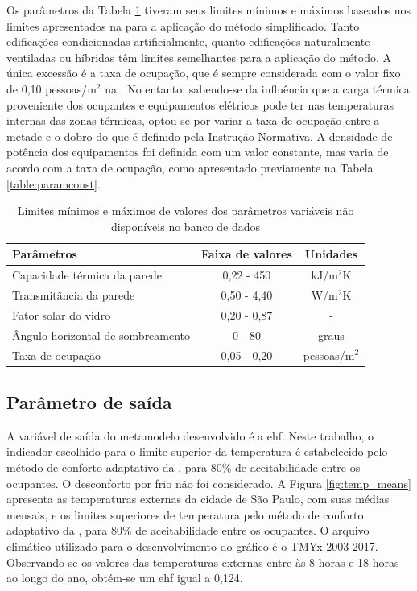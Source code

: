 \documentclass[brazil,hardcopy,openany]{ufscthesis} %
\begin{document}
Os parâmetros da Tabela \ref{table:paraminic} tiveram seus limites mínimos e máximos baseados nos limites apresentados na  para a aplicação do método simplificado. Tanto edificações condicionadas artificialmente, quanto edificações naturalmente ventiladas ou híbridas têm limites semelhantes para a aplicação do método.
A única excessão é a taxa de ocupação, que é sempre considerada com o valor fixo de 0,10 pessoas/m$^2$ na . No entanto, sabendo-se da influência que a carga térmica proveniente dos ocupantes e equipamentos elétricos pode ter nas temperaturas internas das zonas térmicas, optou-se por variar a taxa de ocupação entre a metade e o dobro do que é definido pela Instrução Normativa. A densidade de potência dos equipamentos foi definida com um valor constante, mas varia de acordo com a taxa de ocupação, como apresentado previamente na Tabela \ref{table:paramconst}.

\begin{table}[h]
	\centering
	\caption{Limites mínimos e máximos de valores dos parâmetros variáveis não disponíveis no banco de dados}
	\label{table:paraminic}
	\begin{tabular}{|l |c |c |}
		\hline
		\textbf{Parâmetros} & \textbf{Faixa de valores} & \textbf{Unidades} \\
		\hline
		Capacidade térmica da parede & 0,22 - 450 & kJ/m$^2$K \\
		\hline
		Transmitância da parede & 0,50 - 4,40 & W/m$^2$K \\
		\hline
		Fator solar do vidro & 0,20 - 0,87 & - \\
		\hline 
		Ângulo horizontal de sombreamento & 0 - 80 & graus \\
		\hline 
		Taxa de ocupação & 0,05 - 0,20 & pessoas/m$^2$ \\
		\hline 
	\end{tabular}
\end{table}

\subsection{Parâmetro de saída}

A variável de saída do metamodelo desenvolvido é a \acrfull{ehf}. Neste trabalho, o indicador escolhido para o limite superior da temperatura é estabelecido pelo método de conforto adaptativo da , para 80\% de aceitabilidade entre os ocupantes. O desconforto por frio não foi considerado.
A Figura \ref{fig:temp_means} apresenta as temperaturas externas da cidade de São Paulo, com suas médias mensais, e os limites superiores de temperatura pelo método de conforto adaptativo da , para 80\% de aceitabilidade entre os ocupantes.
O arquivo climático utilizado para o desenvolvimento do gráfico é o TMYx 2003-2017. 
Observando-se os valores das temperaturas externas entre às 8 horas e 18 horas ao longo do ano, obtém-se um \acrshort{ehf} igual a 0,124.
\end{document}
